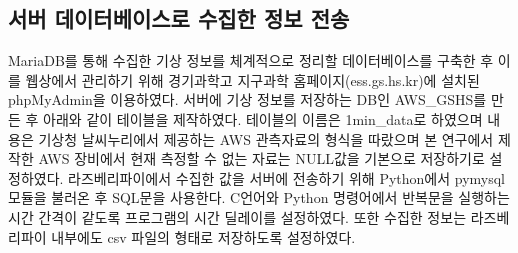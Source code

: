 \subsection{서버 데이터베이스로 수집한 정보 전송}
MariaDB를 통해 수집한 기상 정보를 체계적으로 정리할 데이터베이스를 구축한 후 이를 웹상에서 관리하기 위해 경기과학고 지구과학 홈페이지(ess.gs.hs.kr)에 설치된 phpMyAdmin을 이용하였다.\cite{Ref1} 서버에 기상 정보를 저장하는 DB인 AWS\_GSHS를 만든 후 아래와 같이 테이블을 제작하였다. 테이블의 이름은 1min\_data로 하였으며 내용은 기상청 날씨누리에서 제공하는 AWS 관측자료의 형식을 따랐으며 본 연구에서 제작한 AWS 장비에서 현재 측정할 수 없는 자료는 NULL값을 기본으로 저장하기로 설정하였다.
라즈베리파이에서 수집한 값을 서버에 전송하기 위해 Python에서 pymysql 모듈을 불러온 후 SQL문을 사용한다. C언어와 Python 명령어에서 반복문을 실행하는 시간 간격이 같도록 프로그램의 시간 딜레이를 설정하였다. 또한 수집한 정보는 라즈베리파이 내부에도 csv 파일의 형태로 저장하도록 설정하였다.

